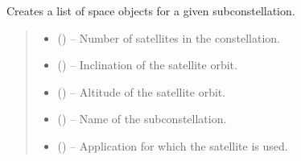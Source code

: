 \documentclass[letterpaper,10pt,english]{sphinxmanual}
\begin{document}

\begin{fulllineitems}
\label{\detokenize{fspsim.utils:fspsim.utils.LaunchModel.create_subconstellation_Space_Objects}}
\pysigstartsignatures
{}
\pysigstopsignatures
\sphinxAtStartPar
Creates a list of space objects for a given sub\sphinxhyphen{}constellation.
\begin{quote}\begin{description}
\begin{itemize}
\item {} 
\sphinxAtStartPar
{} () – Number of satellites in the constellation.

\item {} 
\sphinxAtStartPar
{} () – Inclination of the satellite orbit.

\item {} 
\sphinxAtStartPar
{} () – Altitude of the satellite orbit.

\item {} 
\sphinxAtStartPar
{} () – Name of the sub\sphinxhyphen{}constellation.

\item {} 
\sphinxAtStartPar
{} () – Application for which the satellite is used.


\end{itemize}
\end{description}
\end{quote}
\end{fulllineitems}
\end{document}
